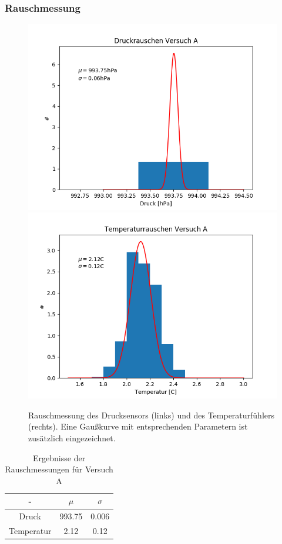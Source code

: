 \documentclass[12pt,a4paper]{article}
\begin{document}
\subsubsection{Rauschmessung}
\begin{figure}
\includegraphics[scale=0.5]{Bilder/DruckrauschenA}
\includegraphics[scale=0.5]{Bilder/TemprauschenA}
\caption[Rauschen Versuch A]{Rauschmessung des Drucksensors (links) und des Temperaturfühlers (rechts). Eine Gaußkurve mit entsprechenden Parametern ist zusätzlich eingezeichnet.}
\label{fig:RauschenA}
\end{figure}

\begin{table}
\begin{center}
\begin{tabular}{|c|c|c|}
\hline
- & $\mu$ & $\sigma$\\
\hline
Druck & 993.75 & 0.006\\
\hline
Temperatur & 2.12 & 0.12\\
\hline
\end{tabular}
\caption[Tab. Rauschen A]{Ergebnisse der Rauschmessungen für Versuch A}
\label{tab:RauschenA}
\end{center}
\end{table}
\end{document}
